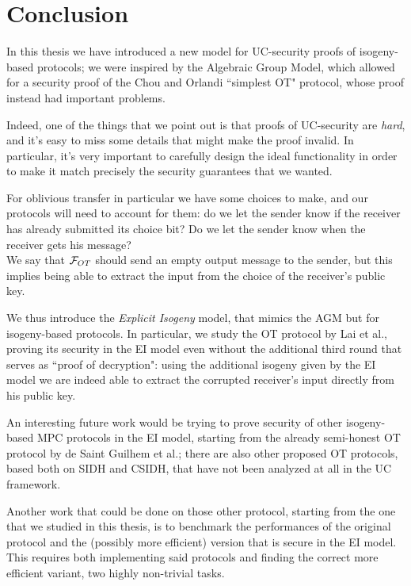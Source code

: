 \chapter*{Conclusion}

In this thesis we have introduced a new model for UC-security proofs of isogeny-based protocols; we were inspired by the Algebraic Group Model, which allowed for a security proof of the Chou and Orlandi ``simplest OT" protocol, whose proof instead had important problems.

Indeed, one of the things that we point out is that proofs of UC-security are \emph{hard}, and it's easy to miss some details that might make the proof invalid. In particular, it's very important to carefully design the ideal functionality in order to make it match precisely the security guarantees that we wanted.

For oblivious transfer in particular we have some choices to make, and our protocols will need to account for them: do we let the sender know if the receiver has already submitted its choice bit? Do we let the sender know when the receiver gets his message?\\
We say that $\mathcal{F}_{OT}$ should send an empty output message to the sender, but this implies being able to extract the input from the choice of the receiver's public key.

We thus introduce the \emph{Explicit Isogeny} model, that mimics the AGM but for isogeny-based protocols. In particular, we study the OT protocol by Lai et al., proving its security in the EI model even without the additional third round that serves as ``proof of decryption": using the additional isogeny given by the EI model we are indeed able to extract the corrupted receiver's input directly from his public key.

An interesting future work would be trying to prove security of other isogeny-based MPC protocols in the EI model, starting from the already semi-honest OT protocol by de Saint Guilhem et al.; there are also other proposed OT protocols, based both on SIDH and CSIDH, that have not been analyzed at all in the UC framework.

Another work that could be done on those other protocol, starting from the one that we studied in this thesis, is to benchmark the performances of the original protocol and the (possibly more efficient) version that is secure in the EI model. This requires both implementing said protocols and finding the correct more efficient variant, two highly non-trivial tasks.

